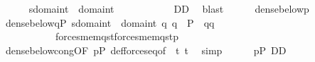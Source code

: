 \begin{isabellebody}
\ \ \ \ \isamarkupfalse%
\ {\isachardoublequoteopen}s{\isasymin}domain{\isacharparenleft}{\kern0pt}t{}{\isacharparenright}{\kern0pt}\ {\isasymunion}\ domain{\isacharparenleft}{\kern0pt}t{}{\isacharparenright}{\kern0pt}{\isachardoublequoteclose}\ \isanewline
\ \ \ \ \isamarkupfalse%
\isanewline
\ \ \ \ \isamarkupfalse%
\ {\isachardoublequoteopen}{\isacharquery}{\kern0pt}D{}{\isasymsubseteq}{\isacharquery}{\kern0pt}D{}{\isachardoublequoteclose}\ \isamarkupfalse%
\ blast\isanewline
\ \ \ \ \isamarkupfalse%
\ {\isacartoucheopen}dense{\isacharunderscore}{\kern0pt}below{\isacharparenleft}{\kern0pt}{\isacharunderscore}{\kern0pt}{\isacharcomma}{\kern0pt}p{\isacharparenright}{\kern0pt}{\isacartoucheclose}\isanewline
\ \ \ \ \isamarkupfalse%
\ {\isachardoublequoteopen}dense{\isacharunderscore}{\kern0pt}below{\isacharparenleft}{\kern0pt}{\isacharbraceleft}{\kern0pt}q{\isacharprime}{\kern0pt}{\isasymin}P{\isachardot}{\kern0pt}\ {\isasymforall}s{\isasymin}domain{\isacharparenleft}{\kern0pt}t{}{\isacharparenright}{\kern0pt}\ {\isasymunion}\ domain{\isacharparenleft}{\kern0pt}t{}{\isacharparenright}{\kern0pt}{\isachardot}{\kern0pt}\ {\isasymforall}q{\isachardot}{\kern0pt}\ q\ {\isasymin}\ P\ {\isasymand}\ q{\isasympreceq}q{\isacharprime}{\kern0pt}\ {\isasymlongrightarrow}\isanewline
\ \ \ \ \ \ \ \ \ \ \ forces{\isacharunderscore}{\kern0pt}mem{\isacharparenleft}{\kern0pt}q{\isacharcomma}{\kern0pt}s{\isacharcomma}{\kern0pt}t{}{\isacharparenright}{\kern0pt}{\isasymlongleftrightarrow}forces{\isacharunderscore}{\kern0pt}mem{\isacharparenleft}{\kern0pt}q{\isacharcomma}{\kern0pt}s{\isacharcomma}{\kern0pt}t{}{\isacharparenright}{\kern0pt}{\isacharbraceright}{\kern0pt}{\isacharcomma}{\kern0pt}p{\isacharparenright}{\kern0pt}{\isachardoublequoteclose}\isanewline
\ \ \ \ \ \ \isamarkupfalse%
\ dense{\isacharunderscore}{\kern0pt}below{\isacharunderscore}{\kern0pt}cong{\isacharprime}{\kern0pt}{\isacharbrackleft}{\kern0pt}OF\ {\isacartoucheopen}p{\isasymin}P{\isacartoucheclose}\ def{\isacharunderscore}{\kern0pt}forces{\isacharunderscore}{\kern0pt}eq{\isacharbrackleft}{\kern0pt}of\ {\isacharunderscore}{\kern0pt}\ t{}\ t{}{\isacharbrackright}{\kern0pt}{\isacharbrackright}{\kern0pt}\ \isamarkupfalse%
\ simp\isanewline
\ \ \ \ \isamarkupfalse%
\ {\isacartoucheopen}p{\isasymin}P{\isacartoucheclose}\ {\isacartoucheopen}{\isacharquery}{\kern0pt}D{}{\isasymsubseteq}{\isacharquery}{\kern0pt}D{}{\isacartoucheclose}\isanewline

\end{isabellebody}
